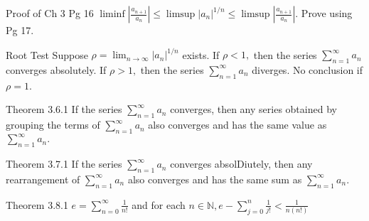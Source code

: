 \documentclass[10pt,landscape]{article}
\theoremstyle{definition}
\newcommand{\thistheoremname}{}
\newtheorem*{genericthm*}{\thistheoremname}
\newenvironment{namedthm*}[1]
{\renewcommand{\thistheoremname}{#1}\begin{genericthm*}}
{\end{genericthm*}}
\begin{document}
\begin{multicols}{3}

	\begin{namedthm*}{Proof of Ch 3 Pg 16}
		\(\liminf \left|\frac{a_{n+1}}{a_{n}}\right| \leq \limsup \left|a_{n}\right|^{1 / n} \leq \limsup \left|\frac{a_{n+1}}{a_{n}}\right|\). Prove using Pg 17.
	\end{namedthm*}

	\begin{namedthm*}{Root Test}
		Suppose \(\rho=\lim _{n \rightarrow \infty}\left|a_{n}\right|^{1 / n}\) exists. If \(\rho<1,\) then the series \(\sum_{n=1}^{\infty} a_{n}\) converges absolutely. If \(\rho>1,\) then the series \(\sum_{n=1}^{\infty} a_{n}\) diverges. No conclusion if \(\rho = 1\).
	\end{namedthm*}

	\begin{namedthm*}{Theorem 3.6.1}
		If the series \(\sum_{n=1}^{\infty} a_{n}\) converges, then any series obtained by grouping the
		terms of \(\sum_{n=1}^{\infty} a_{n}\) also converges and has the same value as \(\sum_{n=1}^{\infty} a_{n} .\)
	\end{namedthm*}

	\begin{namedthm*}{Theorem 3.7.1}
		If the series \(\sum_{n=1}^{\infty} a_{n}\) converges absolDiutely, then any rearrangement of \(\sum_{n=1}^{\infty} a_{n}\) also converges and has the same sum as \(\sum_{n=1}^{\infty} a_{n} .\)
	\end{namedthm*}

	\begin{namedthm*}{Theorem 3.8.1}
		\(e=\sum_{n=0}^{\infty} \frac{1}{n !}\) and for each \(n \in \mathbb{N}, e-\sum_{j=0}^{n}\frac{1}{j !}<\frac{1}{n(n !)}\)
	\end{namedthm*}


\end{multicols}
\end{document}

